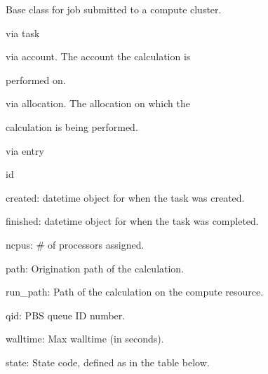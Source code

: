 \documentclass[letterpaper,10pt,english]{sphinxmanual}
\begin{document}
\begin{fulllineitems}
\label{models:qmpy.Job}
Base class for job submitted to a compute cluster.
\begin{description}
\item[{Relationships:}] \leavevmode
\begin{DUlineblock}{0em}
\item[] {\hyperref[models:qmpy.Task]{}} via task
\item[] {\hyperref[models:qmpy.Account]{}} via account. The account the calculation is
\item[]
\begin{DUlineblock}{\DUlineblockindent}
\item[] performed on.
\end{DUlineblock}
\item[] {\hyperref[models:qmpy.Allocation]{}} via allocation. The allocation on which the
\item[]
\begin{DUlineblock}{\DUlineblockindent}
\item[] calculation is being performed.
\end{DUlineblock}
\item[] {\hyperref[models:qmpy.Entry]{}} via entry
\end{DUlineblock}

\item[{Attributes:}] \leavevmode
\begin{DUlineblock}{0em}
\item[] id
\item[] created: datetime object for when the task was created.
\item[] finished: datetime object for when the task was completed.
\item[] ncpus: \# of processors assigned.
\item[] path: Origination path of the calculation.
\item[] run\_path: Path of the calculation on the compute resource.
\item[] qid: PBS queue ID number.
\item[] walltime: Max walltime (in seconds).
\item[] state: State code, defined as in the table below.
\end{DUlineblock}

\end{description}


\end{fulllineitems}
\end{document}
